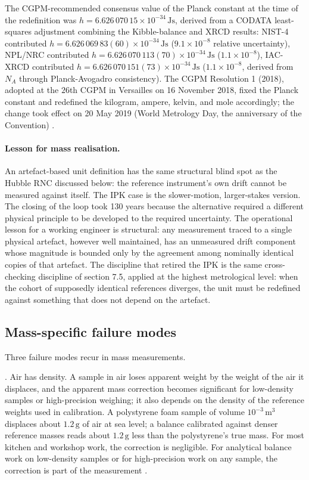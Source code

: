 The CGPM-recommended consensus value of the Planck constant at
the time of the redefinition was $h = 6.626\,070\,15 \times
10^{-34}\,\si{\joule\second}$, derived from a CODATA
least-squares adjustment combining the Kibble-balance and XRCD
results: NIST-4 contributed $h = 6.626\,069\,83(60) \times
10^{-34}\,\si{\joule\second}$ ($9.1 \times 10^{-8}$ relative
uncertainty), NPL/NRC contributed $h = 6.626\,070\,113(70) \times
10^{-34}\,\si{\joule\second}$ ($1.1 \times 10^{-8}$), IAC-XRCD
contributed $h = 6.626\,070\,151(73) \times 10^{-34}\,\si{
\joule\second}$ ($1.1 \times 10^{-8}$, derived from $N_{A}$
through Planck-Avogadro consistency). The CGPM Resolution 1
(2018), adopted at the $26$th CGPM in Versailles on 16 November
2018, fixed the Planck constant and redefined the kilogram,
ampere, kelvin, and mole accordingly; the change took effect on
20 May 2019 (World Metrology Day, the anniversary of the
Convention) \cite{paper:stock-kibble-2018,std:bipm-si2019,%
web:bipm-mise-en-pratique-kilogram-2019}.

\paragraph{Lesson for mass realisation.}
An artefact-based unit definition has the same structural blind spot
as the Hubble RNC discussed below: the reference instrument's own
drift cannot be measured against itself. The IPK case is the
slower-motion, larger-stakes version. The closing of the loop took
130 years because the alternative required a different physical
principle to be developed to the required uncertainty. The
operational lesson for a working engineer is structural: any
measurement traced to a single physical artefact, however well
maintained, has an unmeasured drift component whose magnitude is
bounded only by the agreement among nominally identical copies of
that artefact. The discipline that retired the IPK is the same
cross-checking discipline of section 7.5, applied at the highest
metrological level: when the cohort of supposedly identical
references diverges, the unit must be redefined against something
that does not depend on the artefact.

\subsection{Mass-specific failure modes}

Three failure modes recur in mass measurements.

. Air has density. A sample in air loses
apparent weight by the weight of the air it displaces, and the
apparent mass correction becomes significant for low-density samples
or high-precision weighing; it also depends on the density of the
reference weights used in calibration. A polystyrene foam sample of volume
$10^{-3} \,\si{\meter\cubed}$ displaces about $1.2 \,\si{\gram}$ of
air at sea level; a balance calibrated against denser reference
masses reads about $1.2 \,\si{\gram}$ less than the polystyrene's
true mass. For most kitchen and workshop work, the correction is
negligible. For analytical balance work on low-density samples or
for high-precision work on any sample, the correction is part of the
measurement \cite{text:taylor1997}.

